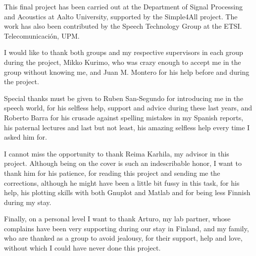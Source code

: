 \documentclass[english,12pt,a4paper,pdftex]{article}
\begin{document}

\makecoverpage

\newpage
%
%


This final project has been carried out at the Department of Signal Processing and Acoustics at Aalto University, supported by the Simple4All project. The work has also been contributed by the Speech Technology Group at the ETSI. Telecomunicaci\'on, UPM.

I would like to thank both groups and my respective supervisors in each group during the project, Mikko Kurimo, who was crazy enough to accept me in the group without knowing me, and Juan M. Montero for his help before and during the project. 

Special thanks must be given to Ruben San-Segundo for introducing me in the speech world, for his selfless help, support and advice during these last years, and Roberto Barra for his crusade against spelling mistakes in my Spanish reports, his paternal lectures and last but not least, his amazing selfless help every time I asked him for.

I cannot miss the opportunity to thank Reima Karhila, my advisor in this project. Although being on the cover is such an indescribable honor, I want to thank him for his patience, for reading this project and sending me the corrections, although he might have been a little bit fussy in this task, for his help, his plotting skills with both Gnuplot and Matlab and for being less Finnish during my stay.

Finally, on a personal level I want to thank Arturo, my lab partner, whose complains have been very supporting during our stay in Finland, and my family, who are thanked as a group to avoid jealousy, for their support, help and love, without which I could have never done this project.
\end{document}
